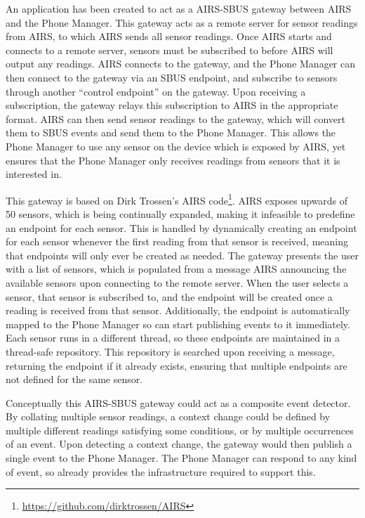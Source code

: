 \documentclass[12pt,twoside,notitlepage]{report}
\begin{document}
An application has been created to act as a AIRS-SBUS gateway between AIRS and the Phone Manager. 
This gateway acts as a remote server for sensor readings from AIRS, to which AIRS sends all sensor readings. 
Once AIRS starts and connects to a remote server, sensors must be subscribed to before AIRS will output any readings. 
AIRS connects to the gateway, and the Phone Manager can then connect to the gateway via an SBUS endpoint, and subscribe to sensors through another ``control endpoint'' on the gateway. 
Upon receiving a subscription, the gateway relays this subscription to AIRS in the appropriate format. 
AIRS can then send sensor readings to the gateway, which will convert them to SBUS events and send them to the Phone Manager. 
This allows the Phone Manager to use any sensor on the device which is exposed by AIRS, yet ensures that the Phone Manager only receives readings from sensors that it is interested in. 
 
This gateway is based on Dirk Trossen's AIRS code\footnote{\url{https://github.com/dirktrossen/AIRS}}. 
AIRS exposes upwards of 50 sensors, which is being continually expanded, making it infeasible to predefine an endpoint for each sensor. 
This is handled by dynamically creating an endpoint for each sensor whenever the first reading from that sensor is received, meaning that endpoints will only ever be created as needed. 
The gateway presents the user with a list of sensors, which is populated from a message AIRS announcing the available sensors upon connecting to the remote server. 
When the user selects a sensor, that sensor is subscribed to, and the endpoint will be created once a reading is received from that sensor. 
Additionally, the endpoint is automatically mapped to the Phone Manager so can start publishing events to it immediately. 
Each sensor runs in a different thread, so these endpoints are maintained in a thread-safe repository. 
This repository is searched upon receiving a message, returning the endpoint if it already exists, ensuring that multiple endpoints are not defined for the same sensor. 

Conceptually this AIRS-SBUS gateway could act as a composite event detector. 
By collating multiple sensor readings, a context change could be defined by multiple different readings satisfying some conditions, or by multiple occurrences of an event.
Upon detecting a context change, the gateway would then publish a single event to the Phone Manager. 
The Phone Manager can respond to any kind of event, so already provides the infrastructure required to support this.
\end{document}
